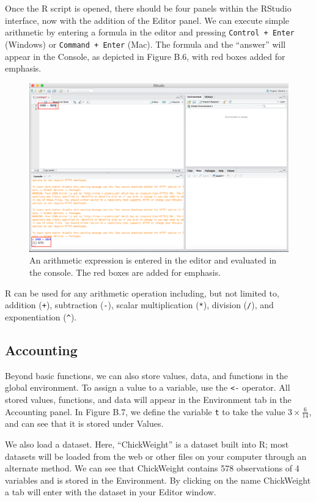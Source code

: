 \documentclass[12pt,]{book}
\begin{document}
Once the R script is opened, there should be four panels within the RStudio interface, now with the addition of the Editor panel. We can execute simple arithmetic by entering a formula in the editor and pressing \texttt{Control\ +\ Enter} (Windows) or \texttt{Command\ +\ Enter} (Mac). The formula and the ``answer'' will appear in the Console, as depicted in Figure B.6, with red boxes added for emphasis.

\begin{figure}
\includegraphics[width=0.6\linewidth]{Images/first_addition} \caption{An arithmetic expression is entered in the editor and evaluated in the console. The red boxes are added for emphasis.}\label{fig:firstaddition}
\end{figure}

R can be used for any arithmetic operation including, but not limited to, addition (\texttt{+}), subtraction (\texttt{-}), scalar multiplication (\texttt{*}), division (\texttt{/}), and exponentiation (\texttt{\^{}}).

\hypertarget{accounting}{%
\subsection{Accounting}\label{accounting}}

Beyond basic functions, we can also store values, data, and functions in the global environment. To assign a value to a variable, use the \texttt{\textless{}-} operator. All stored values, functions, and data will appear in the Environment tab in the Accounting panel. In Figure B.7, we define the variable \texttt{t} to take the value \(3 \times \frac{6}{14}\), and can see that it is stored under Values.

We also load a dataset. Here, ``ChickWeight'' is a dataset built into R; most datasets will be loaded from the web or other files on your computer through an alternate method. We can see that ChickWeight contains 578 observations of 4 variables and is stored in the Environment. By clicking on the name ChickWeight a tab will enter with the dataset in your Editor window.
\end{document}
